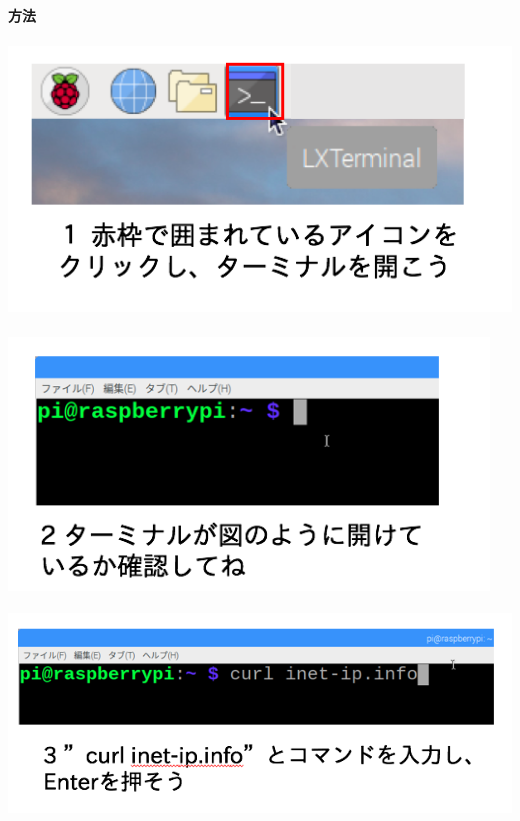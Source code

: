 \documentclass[a4paper,12pt,dvipdfmx]{jarticle}
\begin{document}
\bigskip

{\bfseries
方法}



\centering
\includegraphics[width=13.942cm,height=7.366cm]{ome7-img007.png}

\centering
\includegraphics[width=12.746cm,height=6.742cm]{ome7-img008.png}
\flushleft


\bigskip


\bigskip


\bigskip


\bigskip



\centering
\includegraphics[width=13.716cm,height=5.459cm]{ome7-img018.png}
\end{document}
